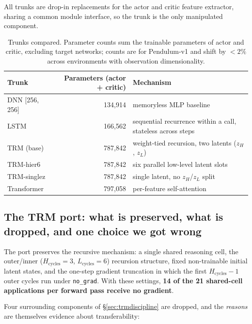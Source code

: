 \documentclass[11pt]{article}
\begin{document}
All trunks are drop-in replacements for the actor and critic feature extractor, sharing a common module interface, so the trunk is the only manipulated component.

\begin{table}[h]
\centering
\small
\begin{tabular}{lrl}
\toprule
Trunk & Parameters (actor + critic) & Mechanism \\
\midrule
DNN [256, 256] & 134{,}914 & memoryless MLP baseline \\
LSTM & 166{,}562 & sequential recurrence within a call, stateless across steps \\
TRM (base) & 787{,}842 & weight-tied recursion, two latents ($z_H$, $z_L$) \\
TRM-hier6 & 787{,}842 & six parallel low-level latent slots \\
TRM-singlez & 787{,}842 & single latent, no $z_H$/$z_L$ split \\
Transformer & 797{,}058 & per-feature self-attention \\
\bottomrule
\end{tabular}
\caption{Trunks compared. Parameter counts sum the trainable parameters of actor and critic, excluding target networks; counts are for Pendulum-v1 and shift by ${<}2\%$ across environments with observation dimensionality.}
\end{table}

\subsection{The TRM port: what is preserved, what is dropped, and one choice we got wrong}
\label{sec:port}

The port preserves the recursive mechanism: a single shared reasoning cell, the outer/inner ($H_{\text{cycles}}=3$, $L_{\text{cycles}}=6$) recursion structure, fixed non-trainable initial latent states, and the one-step gradient truncation in which the first $H_{\text{cycles}}-1$ outer cycles run under \texttt{no\_grad}. With these settings, \textbf{14 of the 21 shared-cell applications per forward pass receive no gradient}.

Four surrounding components of \S\ref{sec:trmdiscipline} are dropped, and the \emph{reasons} are themselves evidence about transferability:
\end{document}
